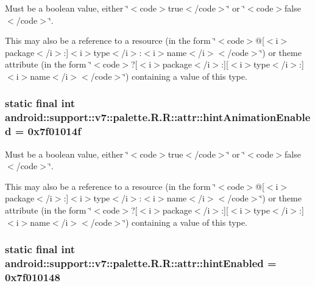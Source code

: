 Must be a boolean value, either \char`\"{}$<$code$>$true$<$/code$>$\char`\"{} or \char`\"{}$<$code$>$false$<$/code$>$\char`\"{}. 

This may also be a reference to a resource (in the form \char`\"{}$<$code$>$@\mbox{[}$<$i$>$package$<$/i$>$:\mbox{]}$<$i$>$type$<$/i$>$:$<$i$>$name$<$/i$>$$<$/code$>$\char`\"{}) or theme attribute (in the form \char`\"{}$<$code$>$?\mbox{[}$<$i$>$package$<$/i$>$:\mbox{]}\mbox{[}$<$i$>$type$<$/i$>$:\mbox{]}$<$i$>$name$<$/i$>$$<$/code$>$\char`\"{}) containing a value of this type. \hypertarget{classandroid_1_1support_1_1v7_1_1palette_1_1_r_1_1attr_187386d2cb1c104cca6a75bb66e5c797}{
\subsubsection[{hintAnimationEnabled}]{\setlength{\rightskip}{0pt plus 5cm}static final int android::support::v7::palette.R.R::attr::hintAnimationEnabled = 0x7f01014f}}
\label{classandroid_1_1support_1_1v7_1_1palette_1_1_r_1_1attr_187386d2cb1c104cca6a75bb66e5c797}


Must be a boolean value, either \char`\"{}$<$code$>$true$<$/code$>$\char`\"{} or \char`\"{}$<$code$>$false$<$/code$>$\char`\"{}. 

This may also be a reference to a resource (in the form \char`\"{}$<$code$>$@\mbox{[}$<$i$>$package$<$/i$>$:\mbox{]}$<$i$>$type$<$/i$>$:$<$i$>$name$<$/i$>$$<$/code$>$\char`\"{}) or theme attribute (in the form \char`\"{}$<$code$>$?\mbox{[}$<$i$>$package$<$/i$>$:\mbox{]}\mbox{[}$<$i$>$type$<$/i$>$:\mbox{]}$<$i$>$name$<$/i$>$$<$/code$>$\char`\"{}) containing a value of this type. \hypertarget{classandroid_1_1support_1_1v7_1_1palette_1_1_r_1_1attr_35335f02b6269bcf7d9332e72376920e}{
\subsubsection[{hintEnabled}]{\setlength{\rightskip}{0pt plus 5cm}static final int android::support::v7::palette.R.R::attr::hintEnabled = 0x7f010148}}
\label{classandroid_1_1support_1_1v7_1_1palette_1_1_r_1_1attr_35335f02b6269bcf7d9332e72376920e}


